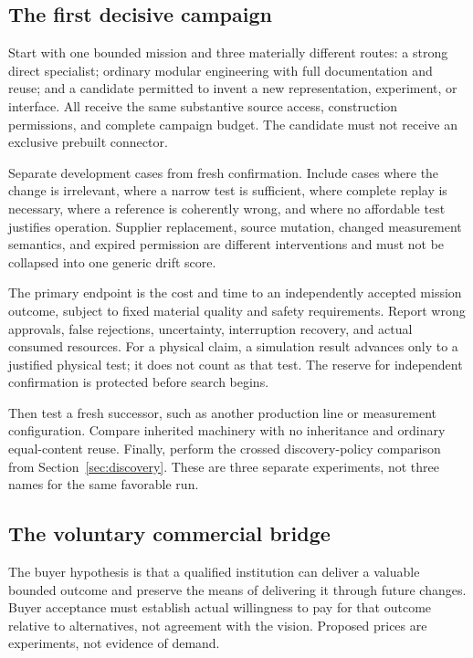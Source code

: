 \subsection{The first decisive campaign}
Start with one bounded mission and three materially different routes: a strong direct specialist; ordinary modular engineering with full documentation and reuse; and a candidate permitted to invent a new representation, experiment, or interface. All receive the same substantive source access, construction permissions, and complete campaign budget. The candidate must not receive an exclusive prebuilt connector.

Separate development cases from fresh confirmation. Include cases where the change is irrelevant, where a narrow test is sufficient, where complete replay is necessary, where a reference is coherently wrong, and where no affordable test justifies operation. Supplier replacement, source mutation, changed measurement semantics, and expired permission are different interventions and must not be collapsed into one generic drift score.

The primary endpoint is the cost and time to an independently accepted mission outcome, subject to fixed material quality and safety requirements. Report wrong approvals, false rejections, uncertainty, interruption recovery, and actual consumed resources. For a physical claim, a simulation result advances only to a justified physical test; it does not count as that test. The reserve for independent confirmation is protected before search begins.

Then test a fresh successor, such as another production line or measurement configuration. Compare inherited machinery with no inheritance and ordinary equal-content reuse. Finally, perform the crossed discovery-policy comparison from Section~\ref{sec:discovery}. These are three separate experiments, not three names for the same favorable run.

\subsection{The voluntary commercial bridge}
The buyer hypothesis is that a qualified institution can deliver a valuable bounded outcome and preserve the means of delivering it through future changes. Buyer acceptance must establish actual willingness to pay for that outcome relative to alternatives, not agreement with the vision. Proposed prices are experiments, not evidence of demand.

